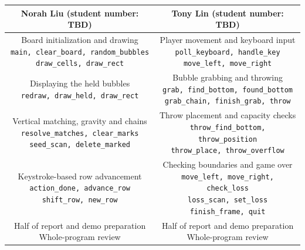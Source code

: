 \documentclass{article}
\begin{document}
\begin{center}
\begin{tabular}{|| c | c ||}
\hline
 Norah Liu (student number: TBD) & Tony Lin (student number: TBD) \\
\hline
\shortstack{Board initialization and drawing\\[2pt]
{\footnotesize\texttt{main, clear\_board, random\_bubbles}}\\
{\footnotesize\texttt{draw\_cells, draw\_rect}}}
&
\shortstack{Player movement and keyboard input\\[2pt]
{\footnotesize\texttt{poll\_keyboard, handle\_key}}\\
{\footnotesize\texttt{move\_left, move\_right}}}\\[5pt]
\hline
\shortstack{Displaying the held bubbles\\[2pt]
{\footnotesize\texttt{redraw, draw\_held, draw\_rect}}}
&
\shortstack{Bubble grabbing and throwing\\[2pt]
{\footnotesize\texttt{grab, find\_bottom, found\_bottom}}\\
{\footnotesize\texttt{grab\_chain, finish\_grab, throw}}}\\[5pt]
\hline
\shortstack{Vertical matching, gravity and chains\\[2pt]
{\footnotesize\texttt{resolve\_matches, clear\_marks}}\\
{\footnotesize\texttt{seed\_scan, delete\_marked}}}
&
\shortstack{Throw placement and capacity checks\\[2pt]
{\footnotesize\texttt{throw\_find\_bottom, throw\_position}}\\
{\footnotesize\texttt{throw\_place, throw\_overflow}}}\\[5pt]
\hline
\shortstack{Keystroke-based row advancement\\[2pt]
{\footnotesize\texttt{action\_done, advance\_row}}\\
{\footnotesize\texttt{shift\_row, new\_row}}}
&
\shortstack{Checking boundaries and game over\\[2pt]
{\footnotesize\texttt{move\_left, move\_right, check\_loss}}\\
{\footnotesize\texttt{loss\_scan, set\_loss}}\\
{\footnotesize\texttt{finish\_frame, quit}}}\\[5pt]
\hline
\shortstack{Half of report and demo preparation\\[2pt]
{\footnotesize Whole-program review}}
&
\shortstack{Half of report and demo preparation\\[2pt]
{\footnotesize Whole-program review}}\\[5pt]
\hline
\end{tabular}
\end{center}
\end{document}
